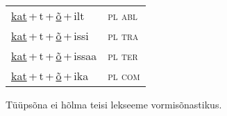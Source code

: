 \begin{minipage}{\textwidth}
\begin{sideways}
\begin{tabular}{l l}
\underline{kat}\,+\,t\,+\,\underline{õ}\,+\,ilt & \textsc{ pl abl } \\
\underline{kat}\,+\,t\,+\,\underline{õ}\,+\,issi & \textsc{ pl tra } \\
\underline{kat}\,+\,t\,+\,\underline{õ}\,+\,issaa & \textsc{ pl ter } \\
\underline{kat}\,+\,t\,+\,\underline{õ}\,+\,ika & \textsc{ pl com } \\
\end{tabular}
\end{sideways}
\label{tab:tüüpsõnamall-katõ}

\end{minipage}

 
\vspace{1em}
\noindent Tüüpsõna ei hõlma teisi lekseeme vormi\-sõnastikus.
